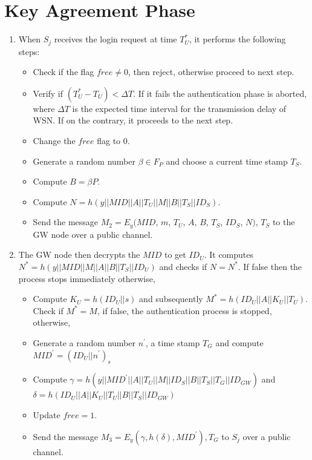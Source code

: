 \documentclass[a4paper,12pt]{report}
\begin{document}
\section{Key Agreement Phase}
\begin{enumerate}
\item When $S_{j}$ receives the login request at time $T_{U}^{*}$, it
performs the following steps:


\begin{itemize}
\item Check if the flag $free \neq 0$, then reject, otherwise proceed
to next step.
\item Verify if $(T_{U}^{*}-T_{U})<\Delta T$. If it fails the authentication phase is aborted,
where $\Delta T$ is the expected time interval for the transmission
delay of WSN. If on the contrary, it proceeds to the next step.
\item Change the $free$ flag to 0.
\item Generate a random number $\beta \in F_{P}$ and choose a current time stamp $T_{S}$.
\item Compute $B = \beta P$.
\item Compute $N = h(y||MID||A||T_{U}||M||B||T_{S}||ID_{S})$.
\item Send the message $M_2= E_y(MID$, $m$, $T_{U}$, $A$, $B$, $T_{S}$, $ID_{S}$, $N)$, $T_S$ to the GW node over a public channel.
\end{itemize}

\item The GW node then decrypts the $MID$ to get $ID_U$. It computes $N^* = h(y||MID||M||A||B||T_S||ID_U)$ and checks if $N = N^*$. If false then the process stops immediately otherwise,
\begin{itemize}
\item Compute $K_{U} = h(ID_{U}||s)$ and subsequently $M^{*} = h(ID_{U}||A||K_{U}||T_{U})$. Check if $M^{*} = M$, if false, the authentication process is stopped, otherwise,
\item Generate a random number $n^{\prime}$, a time stamp $T_{G}$ and compute $MID^{\prime} = (ID_{U}||n^{\prime})_s$
\item Compute $\gamma = h(y||MID^{\prime}||A||T_U||M||ID_S||B||T_S||T_G||ID_{GW})$ and \\$\delta = h(ID_U||A||K_U|| T_U ||B||T_S||ID_{GW})$
\item Update $free=1$.
\item Send the message $M_3= E_y(\gamma, h(\delta), MID^{\prime}), T_G$ to $S_{j}$ over a public channel.\\
\end{itemize}


\end{enumerate}
\end{document}
